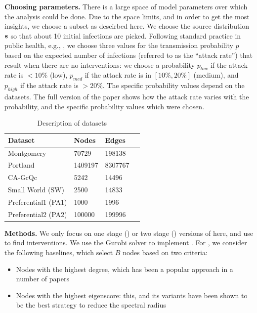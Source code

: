 \noindent
\textbf{Choosing parameters.}
There is a large space of model parameters over which the analysis could be done. Due to the space limits, and
in order to get the most insights, we choose a subset as descirbed here.
We choose the source distribution $\mathbf{s}$ so that about 10 initial infections are picked.
Following standard practice in public health, e.g., \cite{halloran:pnas08},
we choose three values for the transmission probability $p$ based on the expected number of infections (referred to as the ``attack rate'') 
that result when there are no interventions: we choose a probability $p_{low}$ if the attack rate is $<10\%$ (low),
$p_{med}$ if the attack rate is in $[10\%, 20\%]$ (medium), and
$p_{high}$ if the attack rate is $> 20\%$.
The specific probability values depend on the datasets.
The full version of the paper \cite{sambaturu:AAAI20} shows how the attack rate varies with the probability, and the specific probability values which were chosen.

\begin{table}[!h]
\centering
\begin{tabular}{llll}
\hline
 \textbf{Dataset} & \textbf{Nodes} & \textbf{Edges}   \\ \hline
 Montgomery & 70729 & 198138 \\
 Portland & 1409197 & 8307767 \\
 CA-GrQc & 5242 & 14496\\
 Small World (SW) & 2500 & 14833 \\   
 Preferential1 (PA1) & 1000 & 1996 \\ 
Preferential2 (PA2) & 100000 & 199996 \\ \hline
\end{tabular}
\caption{Description of datasets}
\label{tab:datasets}
\end{table}

\noindent
\textbf{Methods.}
We only focus on one stage (\probone) or two stage (\probtwo) versions of \prob{} here, and use \algo{} to find 
interventions. We use the Gurobi solver \cite{gurobi} to implement \algo{}.
For \probone{}, we consider the following baselines, which select $B$ nodes based on two criteria:
\begin{itemize}
\item
Nodes with the highest degree, which has been a popular approach in a number of papers
\cite{salathe:plos12, Barabasi509}
\item
Nodes with the highest eigenscore: this, and its variants have been shown to be the best strategy to reduce the spectral radius
\cite{tong:cikm12,zhang2015controlling,YaoSDM2014,AAAI1816714,PreciadoVM13_2,PreciadoVM13,PreciadoVM14}
\end{itemize}

